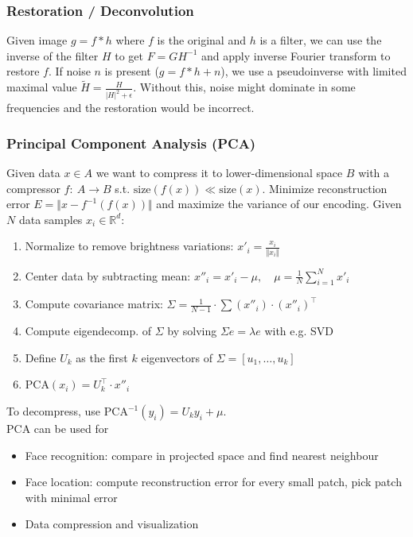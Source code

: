 \documentclass[a4paper,10pt]{article}
\begin{document}
\subsubsection{Restoration / Deconvolution}
Given image \(g = f * h\) where \(f\) is the original and \(h\) is a filter, we can use the inverse of the filter \(H\) to get \(F = GH^{-1}\) and apply inverse Fourier transform to restore \(f\). If noise \(n\) is present (\(g = f * h + n\)), we use a pseudoinverse with limited maximal value \(\tilde{H} = \frac{H}{|H|^2 + \epsilon}\). Without this, noise might dominate in some frequencies and the restoration would be incorrect.

\subsubsection{Principal Component Analysis (PCA)}
Given data \(x \in A\) we want to compress it to lower-dimensional space \(B\) with a compressor \(f: \: A \to B\) s.t. \(\text{size}(f(x)) \ll \text{size}(x)\). Minimize reconstruction error \(E = \Vert x - f^{-1}(f(x)) \Vert\) and maximize the variance of our encoding. Given \(N\) data samples \(x_i \in \mathbb{R}^d\):
\begin{enumerate}
    \item Normalize to remove brightness variations: \( x'_i = \frac{x_i}{\Vert x_i\Vert} \)
    \item Center data by subtracting mean: \( x''_i = x'_i - \mu, \quad \mu = \frac{1}{N}\sum_{i=1}^N x'_i  \)
    \item Compute covariance matrix: \( \Sigma = \frac{1}{N-1}\cdot \sum (x''_i)\cdot (x''_i)^\top \)
    \item Compute eigendecomp. of \( \Sigma \) by solving \( \Sigma e = \lambda e \) with e.g. SVD
    \item Define \( U_k \) as the first \( k \) eigenvectors of \( \Sigma = \left[u_{1}, \ldots, u_k\right] \)
    \item \( \text{PCA}(x_i) = U^\top_k \cdot x''_i \)
\end{enumerate}
To decompress, use \(\text{PCA}^{-1}(y_i) = U_k y_i + \mu\). \\
PCA can be used for
\begin{itemize}
    \item Face recognition: compare in projected space and find nearest neighbour
    \item Face location: compute reconstruction error for every small patch, pick patch with minimal error
    \item Data compression and visualization
\end{itemize}
\end{document}
